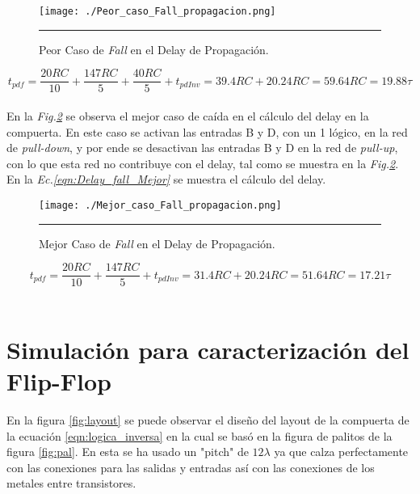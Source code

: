 \documentclass[12pt,a4paper]{article} %
\begin{document}
\begin{figure}[htbp]
  \centering
    \texttt{[image: ./Peor\_caso\_Fall\_propagacion.png]}
    \rule{35em}{0.3pt}
  \caption[C_Carga]{Peor Caso de \textit{Fall} en el Delay de Propagación.}
  \label{fig:Peor_caso_Fall_propagacion}
\end{figure}


\begin{equation}\label{eqn:Delay_fall_Peor}
t_{pdf} = \frac{20RC}{10}+\frac{147RC}{5}+\frac{40RC}{5}+t_{pdInv}=39.4RC+20.24RC=59.64RC=19.88\tau
\end{equation}\\


En la \textit{Fig.\ref{fig:Mejor_caso_Fall_propagacion}} se observa el mejor caso de caída en el cálculo del delay en la compuerta. En este caso se activan las entradas B y D, con un 1 lógico, en la red de \textit{pull-down}, y por ende se desactivan las entradas B y D en la red de \textit{pull-up}, con lo que esta red no contribuye con el delay, tal como se muestra en la \textit{Fig.\ref{fig:Mejor_caso_Fall_propagacion}}. En la \textit{Ec.\ref{eqn:Delay_fall_Mejor}} se muestra el cálculo del delay.\\

\begin{figure}[htbp]
  \centering
    \texttt{[image: ./Mejor\_caso\_Fall\_propagacion.png]}
    \rule{35em}{0.3pt}
  \caption[C_Carga]{Mejor Caso de \textit{Fall} en el Delay de Propagación.}
  \label{fig:Mejor_caso_Fall_propagacion}
\end{figure}


\begin{equation}\label{eqn:Delay_fall_Mejor}
t_{pdf} = \frac{20RC}{10}+\frac{147RC}{5}+t_{pdInv}=31.4RC+20.24RC=51.64RC=17.21\tau
\end{equation}\\




\section{Simulación para caracterización del Flip-Flop}

En la figura \ref{fig:layout} se puede observar el diseño del layout de la compuerta de la ecuación \ref{eqn:logica_inversa} en la cual se basó en la figura de palitos de la figura \ref{fig:pal}. En esta se ha usado un "pitch" de $12\lambda$ ya que calza perfectamente con las conexiones para las salidas y entradas así con las conexiones de los metales entre transistores.
\end{document}
